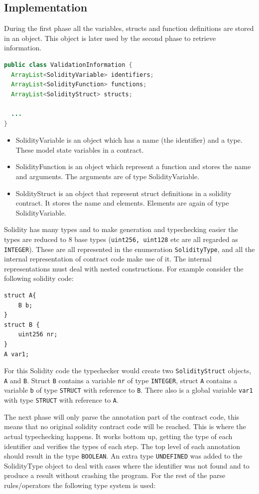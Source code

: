 \documentclass[a4paper]{article}
\begin{document}
\subsection{Implementation}
During the first phase all the variables, structs and function definitions are stored in an object. This object is later used by the second phase to retrieve information.
\begin{lstlisting}[breaklines=true, language=Java ]
public class ValidationInformation {
  ArrayList<SolidityVariable> identifiers;
  ArrayList<SolidityFunction> functions;
  ArrayList<SolidityStruct> structs;

  ...
}
\end{lstlisting}
\begin{itemize}
  \item SolidityVariable is an object which has a name (the identifier) and a type. These model state variables in a contract.
  \item SolidityFunction is an object which represent a function and stores the name and arguments. The arguments are of type SolidityVariable.
  \item SoldityStruct is an object that represent struct definitions in a solidity contract. It stores the name and elements. Elements are again of type SolidityVariable.
\end{itemize}
Solidity has many types and to make generation and typechecking easier the types are reduced to 8 base types (\texttt{uint256, uint128} etc are all regarded as \texttt{INTEGER}). These are all represented in the enumeration \texttt{SolidityType}, and all the internal representation of contract code make use of it. The internal representations must deal with nested constructions. For example consider the following solidity code:
\begin{lstlisting}[breaklines=true, language=Solidity ]
struct A{
    B b;
}
struct B {
    uint256 nr;
}
A var1;
\end{lstlisting}
For this Solidity code the typechecker would create two \texttt{SolidityStruct} objects, \texttt{A} and \texttt{B}. Struct \texttt{B} contains a variable \texttt{nr} of type \texttt{INTEGER}, struct \texttt{A} contains a variable \texttt{b} of type \texttt{STRUCT} with reference to \texttt{B}. There also is a global variable \texttt{var1} with type \texttt{STRUCT} with reference to \texttt{A}. \par
The next phase will only parse the annotation part of the contract code, this means that no original solidity contract code will be reached. This is where the actual typechecking happens. It works bottom up, getting the type of each identifier and verifies the types of each step. The top level of each annotation should result in the type \texttt{BOOLEAN}. An extra type \texttt{UNDEFINED} was added to the SolidityType object to deal with cases where the identifier was not found and to produce a result without crashing the program. For the rest of the parse rules/operators the following type system is used:
\end{document}

